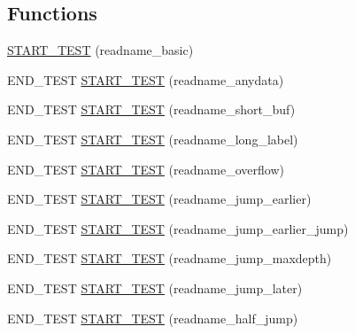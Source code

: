 \subsection*{Functions}
\begin{DoxyCompactItemize}
\item 
\hyperlink{openmote-cc2538_2lwip_2test_2unit_2mdns_2test__mdns_8c_ab52139910d70bc28c091be6bae6bd464}{S\+T\+A\+R\+T\+\_\+\+T\+E\+ST} (readname\+\_\+basic)
\item 
E\+N\+D\+\_\+\+T\+E\+ST \hyperlink{openmote-cc2538_2lwip_2test_2unit_2mdns_2test__mdns_8c_aaed0482e1a3c8b0dfaf15dc9e200004c}{S\+T\+A\+R\+T\+\_\+\+T\+E\+ST} (readname\+\_\+anydata)
\item 
E\+N\+D\+\_\+\+T\+E\+ST \hyperlink{openmote-cc2538_2lwip_2test_2unit_2mdns_2test__mdns_8c_a98f1c07d6e93edf91cba4ff268e3e268}{S\+T\+A\+R\+T\+\_\+\+T\+E\+ST} (readname\+\_\+short\+\_\+buf)
\item 
E\+N\+D\+\_\+\+T\+E\+ST \hyperlink{openmote-cc2538_2lwip_2test_2unit_2mdns_2test__mdns_8c_a744cd6b9d991d7cfcde84fa47f099772}{S\+T\+A\+R\+T\+\_\+\+T\+E\+ST} (readname\+\_\+long\+\_\+label)
\item 
E\+N\+D\+\_\+\+T\+E\+ST \hyperlink{openmote-cc2538_2lwip_2test_2unit_2mdns_2test__mdns_8c_a8b9eba579d62e5f3b46bb787be2c0494}{S\+T\+A\+R\+T\+\_\+\+T\+E\+ST} (readname\+\_\+overflow)
\item 
E\+N\+D\+\_\+\+T\+E\+ST \hyperlink{openmote-cc2538_2lwip_2test_2unit_2mdns_2test__mdns_8c_a3687e5934c6b282f1746a282b107f45f}{S\+T\+A\+R\+T\+\_\+\+T\+E\+ST} (readname\+\_\+jump\+\_\+earlier)
\item 
E\+N\+D\+\_\+\+T\+E\+ST \hyperlink{openmote-cc2538_2lwip_2test_2unit_2mdns_2test__mdns_8c_a79f2dc643436161bad260ab5b429e738}{S\+T\+A\+R\+T\+\_\+\+T\+E\+ST} (readname\+\_\+jump\+\_\+earlier\+\_\+jump)
\item 
E\+N\+D\+\_\+\+T\+E\+ST \hyperlink{openmote-cc2538_2lwip_2test_2unit_2mdns_2test__mdns_8c_a88369891a8ebb204a4ab03b735ba3875}{S\+T\+A\+R\+T\+\_\+\+T\+E\+ST} (readname\+\_\+jump\+\_\+maxdepth)
\item 
E\+N\+D\+\_\+\+T\+E\+ST \hyperlink{openmote-cc2538_2lwip_2test_2unit_2mdns_2test__mdns_8c_acc8f7669f71ac8519765975b1f047e99}{S\+T\+A\+R\+T\+\_\+\+T\+E\+ST} (readname\+\_\+jump\+\_\+later)
\item 
E\+N\+D\+\_\+\+T\+E\+ST \hyperlink{openmote-cc2538_2lwip_2test_2unit_2mdns_2test__mdns_8c_a139abbb0cbfb59b1c927e3e4c0f01cf2}{S\+T\+A\+R\+T\+\_\+\+T\+E\+ST} (readname\+\_\+half\+\_\+jump)
\item 

\end{DoxyCompactItemize}
